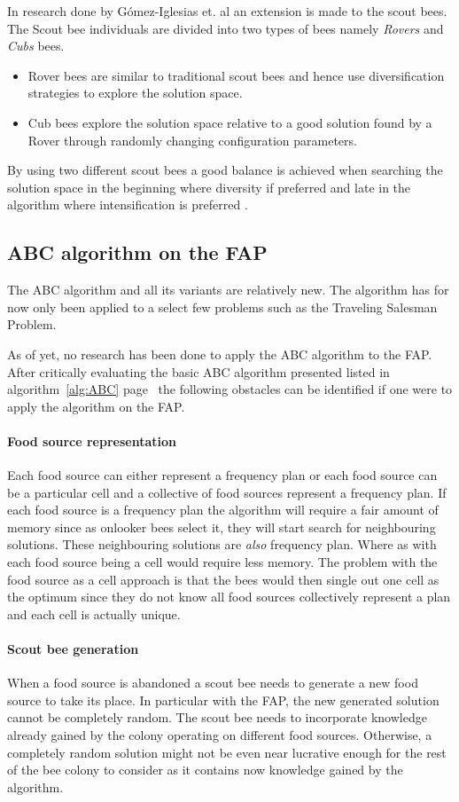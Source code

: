 In research done by G\'{o}mez-Iglesias et. al \cite{ABCFusionGrid} an extension is made to the scout bees. The Scout bee individuals are divided into two types of bees namely \emph{Rovers} and \emph{Cubs} bees\cite{ABCFusionGrid}.
\begin{itemize}
\item{Rover bees} are similar to traditional scout bees and hence use diversification strategies to explore the solution space. 
\item {Cub bees} explore the solution space relative to a good solution found by a Rover through randomly changing configuration parameters. 
\end{itemize}
By using two different scout bees a good balance is achieved when searching the solution space in the beginning where diversity if preferred and late in the algorithm where intensification is preferred \cite{ABCFusionGrid}.
\subsection{ABC algorithm on the FAP}
The ABC algorithm and all its variants are relatively new. The algorithm has for now only been applied to a select few problems such as the Traveling Salesman Problem.

As of yet, no research has been done to apply the ABC algorithm to the FAP. After critically evaluating the basic ABC algorithm presented listed in algorithm~\ref{alg:ABC} page~\pageref{alg:ABC} the following obstacles can be identified if one were to apply the algorithm on the FAP.
\paragraph{Food source representation}
Each food source can either represent a frequency plan or each food source can be a particular cell and a collective of food sources represent a frequency plan. If each food source is a frequency plan the algorithm will require a fair amount of memory since as onlooker bees select it, they will start search for neighbouring solutions. These neighbouring solutions are \emph{also} frequency plan. Where as with each food source being a cell would require less memory. The problem with the food source as a cell approach is that the bees would then single out one cell as the optimum since they do not know all food sources collectively represent a plan and each cell is actually unique.
\paragraph{Scout bee generation}
When a food source is abandoned a scout bee needs to generate a new food source to take its place. In particular with the FAP, the new generated solution cannot be completely random. The scout bee needs to incorporate knowledge already gained by the colony operating on different food sources. Otherwise, a completely random solution might not be even near lucrative enough for the rest of the bee colony to consider as it contains now knowledge gained by the algorithm.
